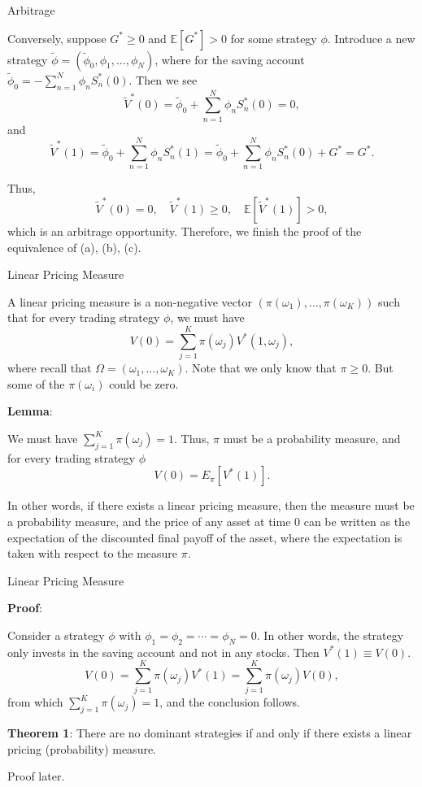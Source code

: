 \documentclass{beamer}
\begin{document}
\begin{frame}{Arbitrage}

    {\footnotesize \footnotesize
        Conversely, suppose $G^* \geq 0$ and $\mathbb{E}[G^*] > 0$ for some strategy $\phi$. Introduce a new strategy $\tilde{\phi} = (\tilde{\phi}_0, \phi_1, \ldots, \phi_N)$, where for the saving account $\tilde{\phi}_0 = -\sum_{n=1}^N \phi_n S_n^*(0)$. Then we see
    \[
    \tilde{V}^*(0) = \tilde{\phi}_0 + \sum_{n=1}^N \phi_n S_n^*(0) = 0,
    \]
    and
    \[
    \tilde{V}^*(1) = \tilde{\phi}_0 + \sum_{n=1}^{N} \phi_n S_n^*(1) = \tilde{\phi}_0 + \sum_{n=1}^{N} \phi_n S_n^*(0) + G^* = G^*.
    \]

     \pause Thus,
    \[
    \tilde{V}^*(0) = 0, \quad \tilde{V}^*(1) \geq 0, \quad \mathbb{E}[\tilde{V}^*(1)] > 0,
    \]
    which is an arbitrage opportunity. Therefore, we finish the proof of the equivalence of (a), (b), (c).
    }
\end{frame}

\begin{frame}{Linear Pricing Measure}

    {\footnotesize \footnotesize
      A linear pricing measure is a non-negative vector $(\pi(\omega_1), \ldots, \pi(\omega_K))$ 
      such that for every trading strategy $\phi$, we must have
    \[
    V(0) = \sum_{j=1}^K \pi(\omega_j) V^*(1, \omega_j),
    \]
    where recall that $\Omega = (\omega_1, \ldots, \omega_K)$. 
    Note that we only know that $\pi \geq 0$. But some of the $\pi(\omega_i)$ could be zero.
    \par  \pause \textbf{Lemma}:
    \par We must have $\sum_{j=1}^K \pi(\omega_j) = 1$. Thus, $\pi$ must be a probability measure, and for every trading strategy $\phi$
    \[
    V(0) = E_\pi [V^*(1)].
    \]

    In other words, if there exists a linear pricing measure, 
    then the measure must be a probability measure, and the price of any asset at time 0 can be written as the expectation of the discounted final 
    payoff of the asset, where the expectation is taken with respect to the measure $\pi$.
    }
\end{frame}
\begin{frame}{Linear Pricing Measure}

    {\footnotesize \footnotesize
       \par \textbf{Proof}:
        \par Consider a strategy $\phi$ with $\phi_1 = \phi_2 = \cdots = \phi_N = 0$. In other words, the strategy only invests in the saving account and not in any stocks. Then $V^*(1) \equiv V(0)$.
    \[
    V(0) = \sum_{j=1}^K \pi(\omega_j) V^*(1) = \sum_{j=1}^K \pi(\omega_j) V(0),
    \]
    from which $\sum_{j=1}^K \pi(\omega_j) = 1$, and the conclusion follows.
    \vspace{1em}

    \par  \pause \textbf{Theorem 1}: There are no dominant strategies 
    if and only if there exists a linear pricing (probability) measure.
    \vspace{1em}
    \par Proof later.
    }
\end{frame}
\end{document}
